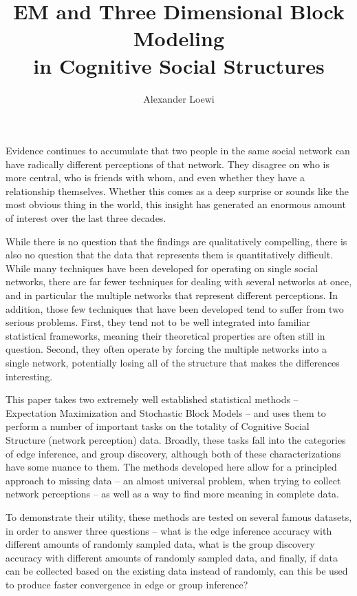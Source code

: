 \documentclass[11pt]{scrartcl}
\title{EM and Three Dimensional Block Modeling\\in Cognitive Social Structures}
\author{Alexander Loewi}
\begin{document}
\maketitle

Evidence continues to accumulate that two people in the same social network can have radically different perceptions of that network. They disagree on who is more central, who is friends with whom, and even whether they have a relationship themselves. Whether this comes as a deep surprise or sounds like the most obvious thing in the world, this insight has generated an enormous amount of interest over the last three decades.

While there is no question that the findings are qualitatively compelling, there is also no question that the data that represents them is quantitatively difficult. While many techniques have been developed for operating on single social networks, there are far fewer techniques for dealing with several networks at once, and in particular the multiple networks that represent different perceptions. In addition, those few techniques that have been developed tend to suffer from two serious problems. First, they tend not to be well integrated into familiar statistical frameworks, meaning their theoretical properties are often still in question. Second, they often operate by forcing the multiple networks into a single network, potentially losing all of the structure that makes the differences interesting.

This paper takes two extremely well established statistical methods -- Expectation Maximization and Stochastic Block Models -- and uses them to perform a number of important tasks on the totality of Cognitive Social Structure (network perception) data. Broadly, these tasks fall into the categories of edge inference, and group discovery, although both of these characterizations have some nuance to them. The methods developed here allow for a principled approach to missing data -- an almost universal problem, when trying to collect network perceptions -- as well as a way to find more meaning in complete data.

To demonstrate their utility, these methods are tested on several famous datasets, in order to answer three questions -- what is the edge inference accuracy with different amounts of randomly sampled data, what is the group discovery accuracy with different amounts of randomly sampled data, and finally, if data can be collected based on the existing data instead of randomly, can this be used to produce faster convergence in edge or group inference?
\end{document}
